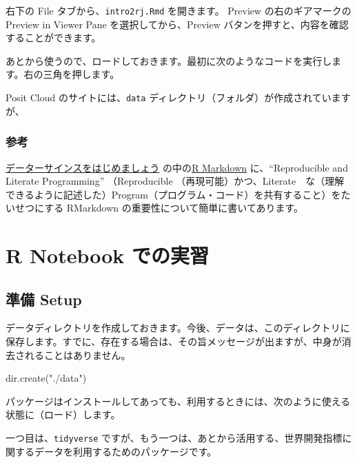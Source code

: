\documentclass[
]{article}
\newenvironment{Shaded}{\begin{snugshade}}{\end{snugshade}}
\newcommand{\FunctionTok}[1]{\textcolor[rgb]{0.00,0.00,0.00}{#1}}
\newcommand{\NormalTok}[1]{#1}
\newcommand{\StringTok}[1]{\textcolor[rgb]{0.31,0.60,0.02}{#1}}
\begin{document}
右下の File タブから、\texttt{intro2rj.Rmd} を開きます。 Preview
の右のギアマークの Preview in Viewer Pane を選択してから、Preview
バタンを押すと、内容を確認することができます。

あとから使うので、ロードしておきます。最初に次のようなコードを実行します。右の三角を押します。

Posit Cloud のサイトには、\texttt{data}
ディレクトリ（フォルダ）が作成されていますが、

\hypertarget{ux53c2ux8003-1}{%
\subsubsection{参考}\label{ux53c2ux8003-1}}

\href{https://icu-hsuzuki.github.io/ds4aj/}{データーサインスをはじめましょう}
の中の\href{https://icu-hsuzuki.github.io/ds4aj/rmarkdown.html\#rmarkdown}{R
Markdown} に、``Reproducible and Literate Programming'' （Reproducible
（再現可能）かつ、Literate　な（理解できるように記述した）Program（プログラム・コード）を共有すること）をたいせつにする
RMarkdown の重要性について簡単に書いてあります。

\hypertarget{r-notebook-ux3067ux306eux5b9fux7fd2}{%
\section{R Notebook
での実習}\label{r-notebook-ux3067ux306eux5b9fux7fd2}}

\hypertarget{ux6e96ux5099-setup}{%
\subsection{準備 Setup}\label{ux6e96ux5099-setup}}

データディレクトリを作成しておきます。今後、データは、このディレクトリに保存します。すでに、存在する場合は、その旨メッセージが出ますが、中身が消去されることはありません。

\begin{Shaded}
\begin{Highlighting}[]
\FunctionTok{dir.create}\NormalTok{(}\StringTok{"./data"}\NormalTok{)}
\end{Highlighting}
\end{Shaded}

パッケージはインストールしてあっても、利用するときには、次のように使える状態に（ロード）します。

一つ目は、\texttt{tidyverse}
ですが、もう一つは、あとから活用する、世界開発指標に関するデータを利用するためのパッケージです。
\end{document}
